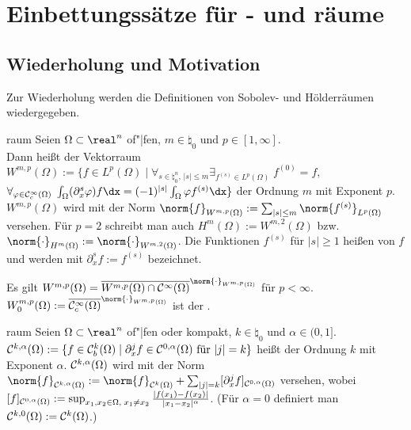 \chapter{%
    Einbettungssätze für - und räume%
}

\section{%
    Wiederholung und Motivation%
}

\begin{Bem}
    Zur Wiederholung werden die Definitionen von Sobolev- und Hölderräumen wiedergegeben.
\end{Bem}

\begin{Def}{raum}
    Seien $\Omega \subset \real^n$ of"|fen, $m \in \natural_0$ und $p \in [1, \infty]$.\\
    Dann heißt der Vektorraum
    $W^{m,p}(\Omega) := \{f \in L^p(\Omega) \;|\; \forall_{s \in \natural_0^n,\, |s| \le m}
    \exists_{f^{(s)} \in L^p(\Omega)}\; f^{(0)} = f,$\\
    $\forall_{\varphi \in \C^\infty_c(\Omega)}\;
    \int_\Omega (\partial_x^s \varphi) f \dx = (-1)^{|s|} \int_\Omega \varphi f^{(s)} \dx\}$
     der Ordnung $m$ mit Exponent $p$.\\
    $W^{m,p}(\Omega)$ wird mit der Norm
    $\norm{f}_{W^{m,p}(\Omega)} := \sum_{|s| \le m} \norm{f^{(s)}}_{L^p(\Omega)}$ versehen.
    Für $p = 2$ schreibt man auch $H^m(\Omega) := W^{m,2}(\Omega)$ bzw.
    $\norm{\cdot}_{H^m(\Omega)} := \norm{\cdot}_{W^{m,2}(\Omega)}$.
    Die Funktionen $f^{(s)}$ für $|s| \ge 1$ heißen  von $f$
    und werden mit $\partial_x^s f := f^{(s)}$ bezeichnet.
\end{Def}

\begin{Bem}
    Es gilt $W^{m,p}(\Omega) =
    \overline{W^{m,p}(\Omega) \cap \C^\infty(\Omega)}^{\norm{\cdot}_{W^{m,p}(\Omega)}}$
    für $p < \infty$.\\
    $W^{m,p}_0(\Omega) := \overline{\C^\infty_c(\Omega)}^{\norm{\cdot}_{W^{m,p}(\Omega)}}$
    ist der .
\end{Bem}

\begin{Def}{raum}
    Seien $\Omega \subset \real^n$ of"|fen oder kompakt,
    $k \in \natural_0$ und $\alpha \in (0, 1]$.\\
    $\mathcal{C}^{k,\alpha}(\Omega) := \{f \in \mathcal{C}^k_b(\Omega) \;|\;
    \partial_x^j f \in \mathcal{C}^{0,\alpha}(\Omega) \text{ für } |j| = k\}$
    heißt  der Ordnung $k$ mit Exponent $\alpha$.
    $\mathcal{C}^{k,\alpha}(\Omega)$ wird mit der Norm
    $\norm{f}_{\C^{k,\alpha}(\Omega)} := \norm{f}_{\C^k(\Omega)} +
    \sum_{|j|=k} [\partial_x^j f]_{\C^{0,\alpha}(\Omega)}$ versehen, wobei
    $[f]_{\mathcal{C}^{0,\alpha}(\Omega)} := \sup_{x_1, x_2 \in \Omega,\; x_1 \not= x_2}
    \frac{|f(x_1) - f(x_2)|}{|x_1 - x_2|^\alpha}$.
    (Für $\alpha = 0$ definiert man $\mathcal{C}^{k,0}(\Omega) := \mathcal{C}^k(\Omega)$.)
\end{Def}

